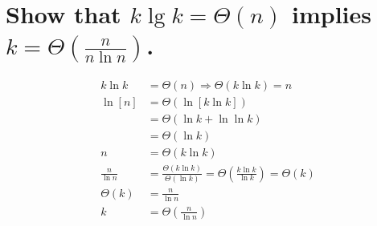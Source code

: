 \section[Problem 3]{Show that $k \lg k = \Theta(n)$ implies $k = \Theta\left(\frac{n}{n \ln n}\right)$.}
\begin{align*}
	k \ln k &= \Theta(n) \Longrightarrow \Theta(k \ln k) = n \\
	\ln [n] &= \Theta ( \ln [k \ln k ] ) \\
	&=
	\Theta (\ln k + \ln \ln k) \\
	&= \Theta(\ln k) \\
	n &= \Theta(k \ln k) \\
	\frac{n}{\ln n} &= \frac{\Theta(k \ln k)}{\Theta(\ln k)} = \Theta \left( \frac{k \ln k}{\ln k} \right) = \Theta(k) \\
	\Theta(k) &= \frac{n}{\ln n} \\ 
	k &= \Theta \left( \frac{n}{\ln n} \right) 
\end{align*}
